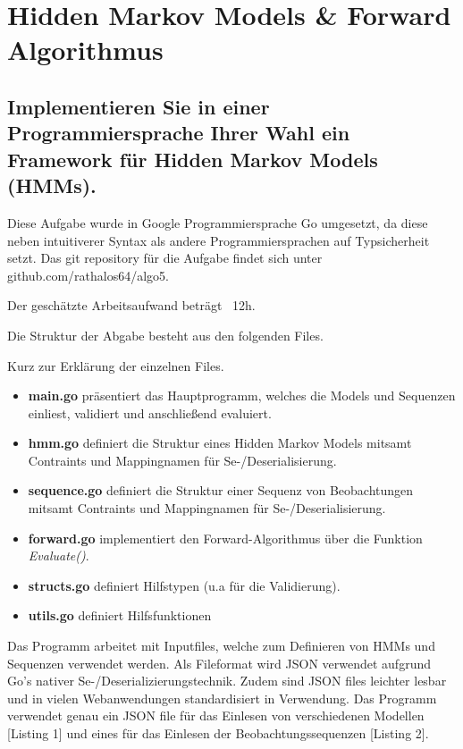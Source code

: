 \section{Hidden Markov Models \& Forward Algorithmus}
\subsection*{Implementieren Sie in einer Programmiersprache Ihrer Wahl ein Framework für Hidden Markov Models (HMMs).}
Diese Aufgabe wurde in Google Programmiersprache Go umgesetzt, da diese neben intuitiverer Syntax als
andere Programmiersprachen auf Typsicherheit setzt. Das git repository für
die Aufgabe findet sich unter github.com/rathalos64/algo5.

Der geschätzte Arbeitsaufwand beträgt ~12h.

\bigskip\noindent
Die Struktur der Abgabe besteht aus den folgenden Files.
\newline
{}

\bigskip
Kurz zur Erklärung der einzelnen Files.
\begin{itemize}
	\item \textbf{main.go} präsentiert das Hauptprogramm, welches die Models und Sequenzen einliest, validiert und
	anschließend evaluiert.
	\item \textbf{hmm.go} definiert die Struktur eines Hidden Markov Models mitsamt Contraints und Mappingnamen für 
	Se-/Deserialisierung.
	\item \textbf{sequence.go} definiert die Struktur einer Sequenz von Beobachtungen mitsamt Contraints und Mappingnamen für 
	Se-/Deserialisierung.
	\item \textbf{forward.go} implementiert den Forward-Algorithmus über die Funktion \textit{Evaluate()}.
	\item \textbf{structs.go} definiert Hilfstypen (u.a für die Validierung).
	\item \textbf{utils.go} definiert Hilfsfunktionen
\end{itemize}

\noindent
Das Programm arbeitet mit Inputfiles, welche zum Definieren von HMMs und Sequenzen verwendet werden.
Als Fileformat wird JSON verwendet aufgrund Go's nativer Se-/Deserializierungstechnik. Zudem sind JSON files 
leichter lesbar und in vielen Webanwendungen standardisiert in Verwendung. Das Programm verwendet genau ein JSON file für
das Einlesen von verschiedenen Modellen [Listing 1] und eines für das Einlesen der Beobachtungssequenzen [Listing 2].

